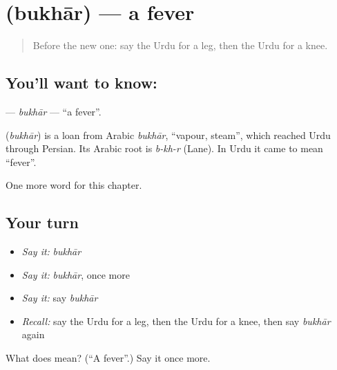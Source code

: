 \section[\texorpdfstring{\ur{بخار} (bukhār)}{بخار (bukhār)}]{ (bukhār) — a fever}

\label{lesson:UR-C40-bukhar}



\begin{quote}
Before the new one: say the Urdu for a leg, then the Urdu for a knee.
\end{quote}

\subsection*{You'll want to know: }
\textbf{} — \emph{bukhār} — \textquotedblleft{}a fever\textquotedblright{}.

\begin{cousinweb}
\textbf{} (\emph{bukhār}) is a loan from Arabic \emph{bukhār}, \textquotedblleft{}vapour, steam\textquotedblright{}, which reached Urdu through Persian. Its Arabic root is \emph{b-kh-r} (Lane). In Urdu it came to mean \textquotedblleft{}fever\textquotedblright{}.
\end{cousinweb}

\begin{grammarlens}[title={What you've built}]
One more word for this chapter.
\end{grammarlens}

\subsection*{Your turn}
\begin{itemize}
\raggedright
  \item \emph{Say it:} \emph{bukhār}
  \item \emph{Say it:} \emph{bukhār}, once more
  \item \emph{Say it:} say \emph{bukhār}
  \item \emph{Recall:} say the Urdu for a leg, then the Urdu for a knee, then say \emph{bukhār} again
\end{itemize}

\begin{tcolorbox}[breakable,colback=teal!4,colframe=teal!35!black,title={Before you move on}]
What does  mean? (\textquotedblleft{}A fever\textquotedblright{}.) Say it once more.
\end{tcolorbox}
